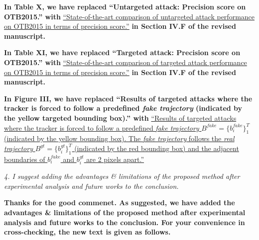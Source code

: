 \documentclass[12pt]{article}
\begin{document}
\textbf{In Table X, we have replaced ``Untargeted attack: Precision score on OTB2015.'' with}
\uline{``State-of-the-art comparison of untargeted attack performance on OTB2015 in terms of precision score.''}
\textbf{in Section IV.F of the revised manuscript.}

\textbf{In Table XI, we have replaced ``Targeted attack: Precision score on OTB2015.'' with}
\uline{``State-of-the-art comparison of targeted attack performance on OTB2015 in terms of precision score.''}
\textbf{in Section IV.F of the revised manuscript.}


\textbf{In Figure III, we have replaced ``Results of targeted attacks where the tracker is forced to follow a predefined \textit{fake trajectory} (indicated by the yellow targeted bounding box).'' with}
\uline{``Results of targeted attacks where the tracker is forced to follow a predefined \textit{fake trajectory} $B^{fake}=\{b^{fake}_i\}_1^{T}$ (indicated by the yellow bounding box). The \textit{fake trajectory} follows the \textit{real trajectory} $B^{gt}=\{b^{gt}_i\}_1^T$ (indicated by the red bounding box) and the adjacent boundaries of $b^{fake}_i$ and $b^{gt}_i$ are 2 pixels apart.''}


\textit{4. I suggest adding the advantages \& limitations of the proposed method after experimental analysis and future works to the conclusion.}

\textbf{Thanks for the good commenet. As suggested, we have added the advantages \& limitations of the proposed method after experimental analysis and future works to the conclusion. For your convenience in cross-checking, the new text is given as follows.}
\end{document}
